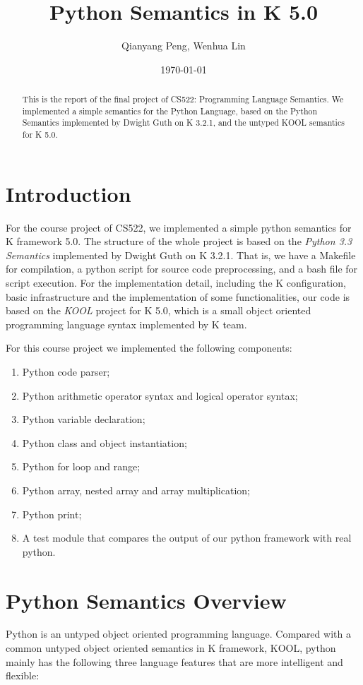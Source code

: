 \documentclass[a4paper]{article}
\title{Python Semantics in K 5.0}
\author{Qianyang Peng, Wenhua Lin}
\date{\today}
\begin{document}
\maketitle

\begin{abstract}
This is the report of the final project of CS522: Programming Language Semantics. We implemented a simple semantics for the Python Language, based on the Python Semantics implemented by Dwight Guth on K 3.2.1, and the untyped KOOL semantics for K 5.0.
\end{abstract}

\section{Introduction}
For the course project of CS522, we implemented a simple python semantics for K framework 5.0. The structure of the whole project is based on the \emph{Python 3.3 Semantics} implemented by Dwight Guth on K 3.2.1. That is, we have a Makefile for compilation, a python script for source code preprocessing, and a bash file for script execution. For the implementation detail, including the K configuration, basic infrastructure and the implementation of some functionalities, our code is based on the \emph{KOOL} project for K 5.0, which is a small object oriented programming language syntax implemented by K team.

For this course project we implemented the following components:

\begin{enumerate}
    \item Python code parser;
    \item Python arithmetic operator syntax and logical operator syntax;
    \item Python variable declaration;
    \item Python class and object instantiation;
    \item Python for loop and range;
    \item Python array, nested array and array multiplication;
    \item Python print;
    \item A test module that compares the output of our python framework with real python.
\end{enumerate}

\section{Python Semantics Overview}
Python is an untyped object oriented programming language. Compared with a common untyped object oriented semantics in K framework, KOOL, python mainly has the following three language features that are more intelligent and flexible:
\end{document}
